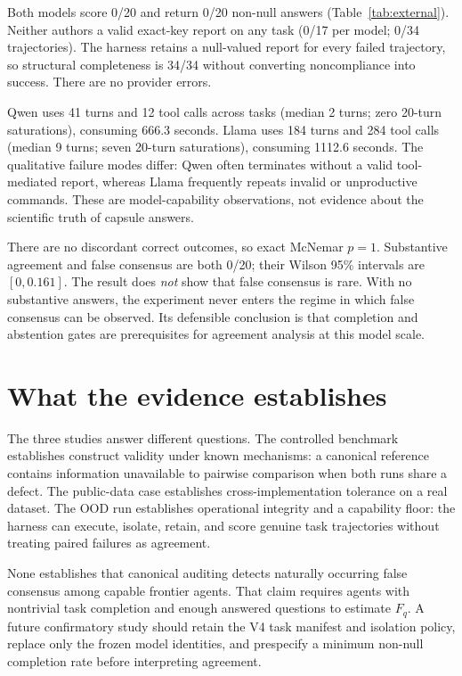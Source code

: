 \documentclass[10pt]{article}
\begin{document}
Both models score 0/20 and return 0/20 non-null answers (Table~\ref{tab:external}). Neither authors a valid exact-key report on any task (0/17 per model; 0/34 trajectories). The harness retains a null-valued report for every failed trajectory, so structural completeness is 34/34 without converting noncompliance into success. There are no provider errors.

Qwen uses 41 turns and 12 tool calls across tasks (median 2 turns; zero 20-turn saturations), consuming 666.3 seconds. Llama uses 184 turns and 284 tool calls (median 9 turns; seven 20-turn saturations), consuming 1112.6 seconds. The qualitative failure modes differ: Qwen often terminates without a valid tool-mediated report, whereas Llama frequently repeats invalid or unproductive commands. These are model-capability observations, not evidence about the scientific truth of capsule answers.

There are no discordant correct outcomes, so exact McNemar $p=1$. Substantive agreement and false consensus are both 0/20; their Wilson 95\% intervals are $[0,0.161]$. The result does \emph{not} show that false consensus is rare. With no substantive answers, the experiment never enters the regime in which false consensus can be observed. Its defensible conclusion is that completion and abstention gates are prerequisites for agreement analysis at this model scale.

\section{What the evidence establishes}
The three studies answer different questions. The controlled benchmark establishes construct validity under known mechanisms: a canonical reference contains information unavailable to pairwise comparison when both runs share a defect. The public-data case establishes cross-implementation tolerance on a real dataset. The OOD run establishes operational integrity and a capability floor: the harness can execute, isolate, retain, and score genuine task trajectories without treating paired failures as agreement.

None establishes that canonical auditing detects naturally occurring false consensus among capable frontier agents. That claim requires agents with nontrivial task completion and enough answered questions to estimate $F_q$. A future confirmatory study should retain the V4 task manifest and isolation policy, replace only the frozen model identities, and prespecify a minimum non-null completion rate before interpreting agreement.
\end{document}
